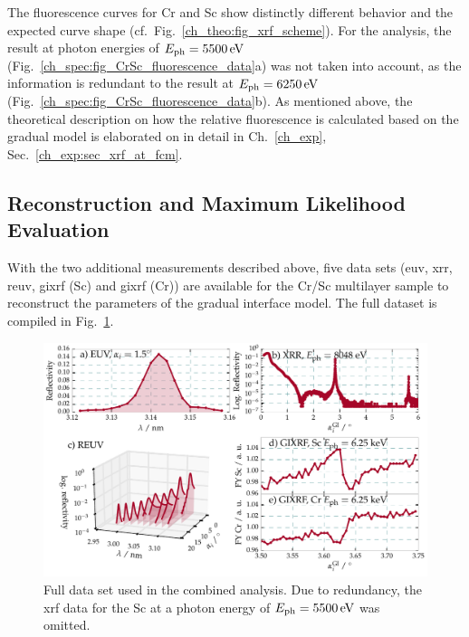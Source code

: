 The fluorescence curves for Cr and Sc show distinctly different behavior and the expected curve shape (cf.~Fig.~\ref{ch_theo:fig_xrf_scheme}). For the analysis, the result at photon energies of $E_\text{ph}=\ev{5500}$ (Fig.~\ref{ch_spec:fig_CrSc_fluorescence_data}a)  was not taken into account, as the information is redundant to the result at  $E_\text{ph}=\ev{6250}$ (Fig.~\ref{ch_spec:fig_CrSc_fluorescence_data}b). As mentioned above, the theoretical description on how the relative fluorescence is calculated based on the gradual model is elaborated on in detail in Ch.~\ref{ch_exp}, Sec.~\ref{ch_exp:sec_xrf_at_fcm}.

\subsection{Reconstruction and Maximum Likelihood Evaluation}\label{ch_spec:sec_CrSc_results}
With the two additional measurements described above, five data sets (\gls{euv}, \gls{xrr}, \gls{reuv}, \gls{gixrf} (Sc) and \gls{gixrf} (Cr)) are available for the Cr/Sc multilayer sample to reconstruct the parameters of the gradual interface model. The full dataset is compiled in Fig.~\ref{ch_spec:fig_CrSc_all_data}.
\begin{figure}[htbp]
  \centering
  \includegraphics[width=\textwidth]{img/CrSc_all_data}
  \caption{Full data set used in the combined analysis. Due to redundancy, the \gls{xrf} data for the Sc at a photon energy of $E_\text{ph}=\ev{5500}$ was omitted.}
  \label{ch_spec:fig_CrSc_all_data}
\end{figure}

